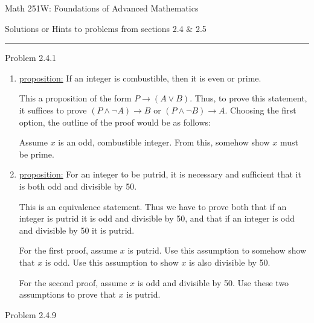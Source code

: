 \documentclass{article}
\theoremstyle{definition}
\begin{document}
	\begin{center}
		\Large{Math 251W: Foundations of Advanced Mathematics}

		\normalsize Solutions or Hints to problems from sections 2.4 $\&$ 2.5 \hrule
		\vspace{0.75cm}
	\end{center}


	\noindent Problem 2.4.1  \vspace{0.3cm}

	\begin{enumerate}
		\item[1] \underline{proposition:} If an integer is combustible, then
		it is even or prime.

		This a proposition of the form $P\rightarrow(A\vee B)$. Thus, to
		prove this statement, it suffices to prove $(P\wedge\neg
		A)\rightarrow B$ or $(P\wedge\neg B)\rightarrow A$. Choosing the
		first option, the outline of the proof would be as follows:

		Assume $x$ is an odd, combustible integer. From this, somehow show
		$x$ must be prime.

		\item[3] \underline{proposition:} For an integer to be putrid, it is
		necessary and sufficient that it is both odd and divisible by 50.

		This is an equivalence statement. Thus we have to prove both that
		if an integer is putrid it is odd and divisible by 50, and that if
		an integer is odd and divisible by 50 it is putrid.

		For the first proof, assume $x$ is putrid. Use this assumption to
		somehow show that $x$ is odd. Use this assumption to show $x$ is
		also divisible by 50.

		For the second proof, assume $x$ is odd and divisible by 50. Use
		these two assumptions to prove that $x$ is putrid.
	\end{enumerate}

	\vspace{1cm}


	\noindent Problem 2.4.9  \vspace{0.3cm}
\end{document}
